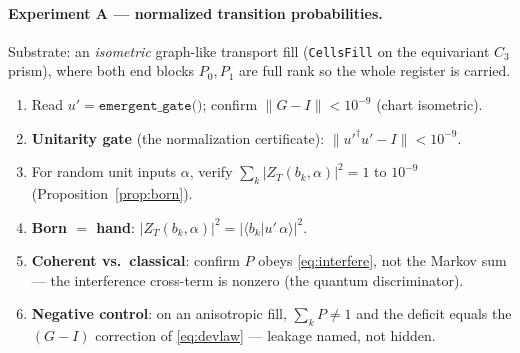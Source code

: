 \documentclass[11pt]{article}
\newcommand{\braket}[2]{\langle #1 \vert #2 \rangle}
\newcommand{\norm}[1]{\lVert #1 \rVert}
\newcommand{\abs}[1]{\lvert #1 \rvert}
\newcommand{\ZT}{Z_{T}}
\newcommand{\code}[1]{\texttt{#1}}
\theoremstyle{plain}
\theoremstyle{definition}
\begin{document}
\paragraph{Experiment A --- normalized transition probabilities.}
Substrate: an \emph{isometric} graph-like transport fill (\code{CellsFill} on the equivariant
$C_3$ prism), where both end blocks $P_0,P_1$ are full rank so the whole register is carried.
\begin{enumerate}[nosep]
  \item Read $u'=\code{emergent\_gate()}$; confirm $\norm{G-I}<10^{-9}$ (chart isometric).
  \item \textbf{Unitarity gate} (the normalization certificate): $\norm{u'^\dagger u'-I}<10^{-9}$.
  \item For random unit inputs $\alpha$, verify $\sum_k\abs{\ZT(b_k,\alpha)}^2=1$ to $10^{-9}$
        (Proposition~\ref{prop:born}).
  \item \textbf{Born $=$ hand}: $\abs{\ZT(b_k,\alpha)}^2=\abs{\braket{b_k}{u'\,\alpha}}^2$.
  \item \textbf{Coherent vs.\ classical}: confirm $P$ obeys \eqref{eq:interfere}, not the Markov
        sum --- the interference cross-term is nonzero (the quantum discriminator).
  \item \textbf{Negative control}: on an anisotropic fill, $\sum_k P\neq 1$ and the deficit equals
        the $(G-I)$ correction of \eqref{eq:devlaw} --- leakage named, not hidden.
\end{enumerate}
\end{document}
